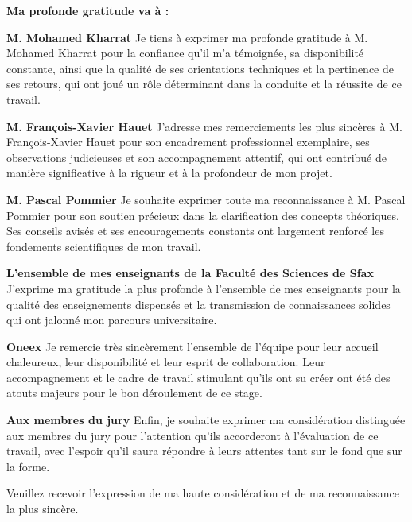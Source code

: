 \textbf{Ma profonde gratitude va à :}

\medskip

\textbf{M. Mohamed Kharrat}
Je tiens à exprimer ma profonde gratitude à M. Mohamed Kharrat pour la confiance qu’il m’a témoignée, sa disponibilité constante, ainsi que la qualité de ses orientations techniques et la pertinence de ses retours, qui ont joué un rôle déterminant dans la conduite et la réussite de ce travail.

\medskip

\textbf{M. François-Xavier Hauet}
J’adresse mes remerciements les plus sincères à M. François-Xavier Hauet pour son encadrement professionnel exemplaire, ses observations judicieuses et son accompagnement attentif, qui ont contribué de manière significative à la rigueur et à la profondeur de mon projet.

\medskip

\textbf{M. Pascal Pommier}
Je souhaite exprimer toute ma reconnaissance à M. Pascal Pommier pour son soutien précieux dans la clarification des concepts théoriques. Ses conseils avisés et ses encouragements constants ont largement renforcé les fondements scientifiques de mon travail.

\medskip

\textbf{L’ensemble de mes enseignants de la Faculté des Sciences de Sfax}
J’exprime ma gratitude la plus profonde à l’ensemble de mes enseignants pour la qualité des enseignements dispensés et la transmission de connaissances solides qui ont jalonné mon parcours universitaire.

\medskip

\textbf{Oneex}
Je remercie très sincèrement l’ensemble de l’équipe pour leur accueil chaleureux, leur disponibilité et leur esprit de collaboration. Leur accompagnement et le cadre de travail stimulant qu’ils ont su créer ont été des atouts majeurs pour le bon déroulement de ce stage.

\medskip

\textbf{Aux membres du jury}
Enfin, je souhaite exprimer ma considération distinguée aux membres du jury pour l’attention qu’ils accorderont à l’évaluation de ce travail, avec l’espoir qu’il saura répondre à leurs attentes tant sur le fond que sur la forme.

Veuillez recevoir l’expression de ma haute considération et de ma reconnaissance la plus sincère.

